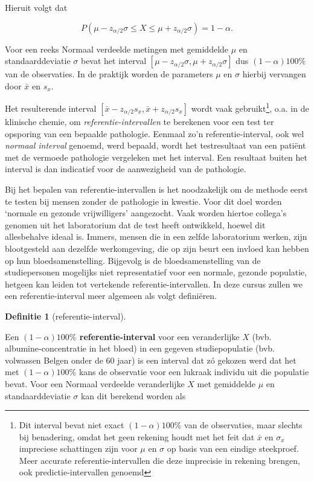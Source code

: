 \documentclass[
  12pt,dutch,coursenotes]{book}
\theoremstyle{definition}
\newtheorem{definition}{Definitie}[chapter]
\theoremstyle{definition}
\theoremstyle{definition}
\theoremstyle{remark}
\begin{document}
Hieruit volgt dat

\begin{equation*}
P( \mu - z_{\alpha/2} \sigma \leq X \leq \mu + z_{\alpha/2} \sigma ) =
1-\alpha .
\end{equation*}

Voor een reeks Normaal verdeelde metingen met gemiddelde \(\mu\) en
standaarddeviatie \(\sigma\) bevat het interval \([\mu-z_{\alpha/2}\sigma,\mu+z_{\alpha/2}\sigma]\) dus \((1-\alpha)100\%\) van de observaties. In de
praktijk worden de parameters \(\mu\) en \(\sigma\) hierbij vervangen door \(\bar x\) en \(s_x\).

Het resulterende interval \([\bar x-z_{\alpha/2}s_x,\bar x+z_{\alpha/2}s_x]\)
wordt vaak gebruikt\footnote{Dit interval bevat niet exact \((1-\alpha)100\%\) van de observaties, maar slechts bij benadering, omdat het geen rekening houdt met het feit dat \(\bar x\) en \(\sigma_x\) impreciese schattingen zijn voor \(\mu\) en \(\sigma\) op basis van een eindige steekproef. Meer accurate referentie-intervallen die deze imprecisie in rekening brengen, ook predictie-intervallen genoemd}, o.a. in de klinische chemie, om \emph{referentie-intervallen} te berekenen voor een test ter opsporing van een
bepaalde pathologie. Eenmaal zo'n referentie-interval, ook wel \emph{normaal interval} genoemd, werd bepaald, wordt het testresultaat van een
patiënt met de vermoede pathologie vergeleken met het interval. Een
resultaat buiten het interval is dan indicatief voor de aanwezigheid van de
pathologie.

Bij het bepalen van referentie-intervallen is het noodzakelijk om de methode
eerst te testen bij mensen zonder de pathologie in kwestie. Voor dit doel
worden `normale en gezonde vrijwilligers' aangezocht. Vaak worden hiertoe
collega's genomen uit het laboratorium dat de test heeft ontwikkeld, hoewel
dit allesbehalve ideaal is. Immers, mensen die in een zelfde laboratorium
werken, zijn blootgesteld aan dezelfde werkomgeving, die op zijn beurt een
invloed kan hebben op hun bloedsamenstelling. Bijgevolg is de
bloedsamenstelling van de studiepersonen mogelijks niet representatief voor
een normale, gezonde populatie, hetgeen kan leiden tot vertekende
referentie-intervallen. In deze cursus zullen we een referentie-interval
meer algemeen als volgt definiëren.

\begin{definition}[referentie-interval]
\protect\hypertarget{def:unnamed-chunk-44}{}{\label{def:unnamed-chunk-44} \iffalse (referentie-interval) \fi{} }
\end{definition}
Een \textbf{\((1-\alpha)100\%\) referentie-interval}
voor een veranderlijke \(X\) (bvb. albumine-concentratie
in het bloed) in een gegeven studiepopulatie (bvb. volwassen Belgen onder de
60 jaar) is een interval dat zó gekozen werd dat het met \((1-\alpha)100\%\)
kans de observatie voor een lukraak individu uit die populatie bevat. Voor
een Normaal verdeelde veranderlijke \(X\) met gemiddelde \(\mu\) en
standaarddeviatie \(\sigma\) kan dit berekend worden als
\end{document}
